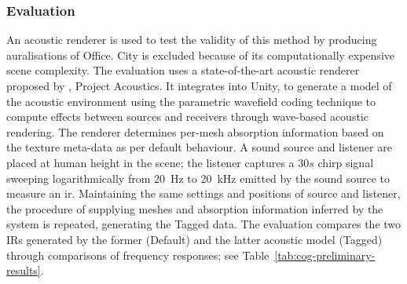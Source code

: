 \subsubsection{Evaluation}
An acoustic renderer is used to test the validity of this method by producing auralisations of Office. City is excluded because of its computationally expensive scene complexity. The evaluation uses a state-of-the-art acoustic renderer proposed by \cite{raghuvanshi2014parametric}, Project Acoustics. It integrates into Unity, to generate a model of the acoustic environment using the parametric wavefield coding technique to compute effects between sources and receivers through wave-based acoustic rendering. The renderer determines per-mesh absorption information based on the texture meta-data as per default behaviour. A sound source and listener are placed at human height in the scene; the listener captures a $30s$ chirp signal sweeping logarithmically from \qty{20}{\Hz} to \qty{20}{\kHz} emitted by the sound source to measure an \acrshort{ir}. Maintaining the same settings and positions of source and listener, the procedure of supplying meshes and absorption information inferred by the system is repeated, generating the Tagged data. The evaluation compares the two IRs generated by the former (Default) and the latter acoustic model (Tagged) through comparisons of frequency responses; see Table~\ref{tab:cog-preliminary-results}.

